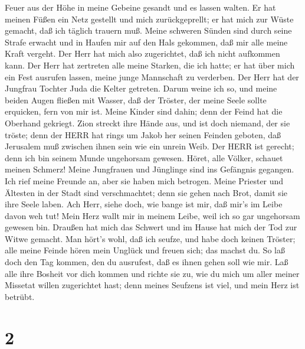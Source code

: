 Feuer aus der Höhe in meine Gebeine gesandt und es lassen walten. Er hat
meinen Füßen ein Netz gestellt und mich zurückgeprellt; er hat mich zur
Wüste gemacht, daß ich täglich trauern muß.  Meine schweren
Sünden sind durch seine Strafe erwacht und in Haufen mir auf den Hals
gekommen, daß mir alle meine Kraft vergeht. Der Herr hat mich also
zugerichtet, daß ich nicht aufkommen kann.  Der Herr hat
zertreten alle meine Starken, die ich hatte; er hat über mich ein Fest
ausrufen lassen, meine junge Mannschaft zu verderben. Der Herr hat der
Jungfrau Tochter Juda die Kelter getreten.  Darum weine ich
so, und meine beiden Augen fließen mit Wasser, daß der Tröster, der
meine Seele sollte erquicken, fern von mir ist. Meine Kinder sind dahin;
denn der Feind hat die Oberhand gekriegt.  Zion streckt
ihre Hände aus, und ist doch niemand, der sie tröste; denn der HERR hat
rings um Jakob her seinen Feinden geboten, daß Jerusalem muß zwischen
ihnen sein wie ein unrein Weib.  Der HERR ist gerecht; denn
ich bin seinem Munde ungehorsam gewesen. Höret, alle Völker, schauet
meinen Schmerz! Meine Jungfrauen und Jünglinge sind ins Gefängnis
gegangen.  Ich rief meine Freunde an, aber sie haben mich
betrogen. Meine Priester und Ältesten in der Stadt sind verschmachtet;
denn sie gehen nach Brot, damit sie ihre Seele laben.  Ach
Herr, siehe doch, wie bange ist mir, daß mir's im Leibe davon weh tut!
Mein Herz wallt mir in meinem Leibe, weil ich so gar ungehorsam gewesen
bin. Draußen hat mich das Schwert und im Hause hat mich der Tod zur
Witwe gemacht.  Man hört's wohl, daß ich seufze, und habe
doch keinen Tröster; alle meine Feinde hören mein Unglück und freuen
sich; das machst du. So laß doch den Tag kommen, den du ausrufest, daß
es ihnen gehen soll wie mir.  Laß alle ihre Bosheit vor
dich kommen und richte sie zu, wie du mich um aller meiner Missetat
willen zugerichtet hast; denn meines Seufzens ist viel, und mein Herz
ist betrübt.

\hypertarget{section-1}{%
\section{2}\label{section-1}}

